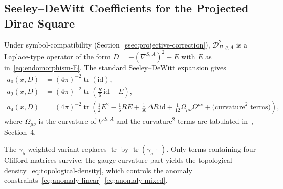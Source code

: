 \documentclass[11pt,a4paper]{article}
\theoremstyle{definition}
\theoremstyle{remark}
\begin{document}
  \newpage
  \begin{appendix}

    \section{Seeley--DeWitt Coefficients for the Projected Dirac Square}
      \label{app:seeley-dewitt}

      Under symbol-compatibility (Section~\ref{ssec:projective-correction}),
      $\mathcal{D}_{\Pi,g,A}^2$ is a Laplace-type operator of the form
      $D = -(\nabla^{S,A})^2 + E$ with $E$ as in~\eqref{eq:endomorphism-E}.
      The standard Seeley--DeWitt expansion gives~\cite{Vassilevich2003}
      \begin{align}
        \label{eq:sdw-a0}
        a_0(x, D) &= (4\pi)^{-2} \operatorname{tr}(\mathrm{id}), \\
        \label{eq:sdw-a2}
        a_2(x, D) &= (4\pi)^{-2} \operatorname{tr}\!\left(\tfrac{R}{6}\,\mathrm{id} - E\right), \\
        \label{eq:sdw-a4}
        a_4(x, D) &= (4\pi)^{-2} \operatorname{tr}\!\left(
                                                      \tfrac{1}{2}E^2 - \tfrac{1}{6}RE
          + \tfrac{1}{30}\Delta R\,\mathrm{id}
                                                      + \tfrac{1}{12}\Omega_{\mu\nu}\Omega^{\mu\nu}
                                                      + \text{(curvature}^2\text{ terms)}
        \right),
      \end{align}
      where $\Omega_{\mu\nu}$ is the curvature of $\nabla^{S,A}$ and the curvature$^2$
      terms are tabulated in~\cite{Vassilevich2003}, Section~4.

      The $\gamma_5$-weighted variant replaces $\operatorname{tr}$ by
      $\operatorname{tr}(\gamma_5\,\cdot\,)$.
      Only terms containing four Clifford matrices survive; the gauge-curvature part
      yields the topological density~\eqref{eq:topological-density}, which controls the
      anomaly constraints~\eqref{eq:anomaly-linear}--\eqref{eq:anomaly-mixed}.

  \end{appendix}

  \newpage
  
  
\end{document}
